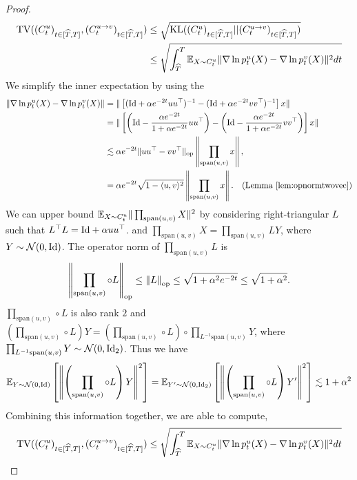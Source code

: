 \begin{proof}
\begin{align*}
\mathrm{TV}((C^u_t)_{t \in [\widehat{T},T]},(C^{u \to v}_t)_{t \in [\widehat{T},T]}) &\leq \sqrt{\mathrm{KL}((C^u_t)_{t \in [\widehat{T},T]}||(C^{u \to v}_t)_{t \in [\widehat{T},T]})}\\
&\leq \sqrt{\int_{\widehat{T}}^T \mathbb{E}_{X \sim C^u_t}\|\nabla \ln p^u_t(X) - \nabla \ln p^v_t(X)\|^2 dt}
\end{align*}
We simplify the inner expectation by using the 
\begin{align*}
\|\nabla \ln p^u_t(X)- \nabla \ln p^v_t(X)\| &= \|\left[(\mathrm{Id}+\alpha e^{-2t}uu^\top)^{-1}-(\mathrm{Id}+\alpha e^{-2t}vv^\top)^{-1}\right]x\|\\
 &= \|\left[\left(\mathrm{Id}-\frac{\alpha e^{-2t}}{1+\alpha e^{-2t}}uu^\top\right)-\left(\mathrm{Id}-\frac{\alpha e^{-2t}}{1+\alpha e^{-2t}}vv^\top\right)\right]x\|\\
&\lesssim \alpha e^{-2t} \|uu^\top - vv^\top\|_{\rm op}\left\|\prod_{\textrm{span}(u,v)}x\right\|,\\
&= \alpha e^{-2t}\sqrt{1-\langle u,v\rangle^2}\left\|\prod_{\textrm{span}(u,v)}x\right\|.\quad (\text{Lemma}~\ref{lem:opnormtwovec})
\end{align*}
We can upper bound $\mathbb{E}_{X \sim C^u_t}\|\prod_{\textrm{span}(u,v)}X\|^2$ by considering right-triangular $L$ such that $L^\top L  = \mathrm{Id}+\alpha uu^\top$. and $\prod_{\textrm{span}(u,v)} X = \prod_{\textrm{span}(u,v)}L Y$, where $Y \sim \mathcal{N}(0,\mathrm{Id})$. The operator norm of $\prod_{\textrm{span}(u,v)} L$ is 
\begin{align*}
\left\| \prod_{\textrm{span}(u,v)} \circ L \right\|_{\rm op}   \leq \left\| L \right\|_{\rm op}   \leq \sqrt{1+\alpha^2e^{-2t}} \leq \sqrt{1+\alpha^2}.
\end{align*}
$\prod_{\textrm{span}(u,v)} \circ L$ is also rank $2$ and $\left(\prod_{\textrm{span}(u,v)}\circ L\right)Y=\left(\prod_{\textrm{span}(u,v)}\circ L \right)\circ \prod_{L^{-1}\textrm{span}(u,v)}Y$, where $\prod_{L^{-1}\textrm{span}(u,v)}Y \sim \mathcal{N}(0,\mathrm{Id}_2)$. Thus we have
\begin{align*}
\mathbb{E}_{Y \sim \mathcal{N}(0,\mathrm{Id})}\left[\left\|\left(\prod_{\textrm{span}(u,v)}\circ L\right)Y\right\|^2\right] = \mathbb{E}_{Y' \sim \mathcal{N}(0,\mathrm{Id}_2)}\left[\left\|\left(\prod_{\textrm{span}(u,v)}\circ L \right)Y'\right\|^2\right] \lesssim 1+\alpha^2
\end{align*}
Combining this information together, we are able to compute,
\begin{align*}
\TV((C^u_t)_{t \in [\wh{T},T]},(C^{u \to v}_t)_{t \in [\wh{T},T]})  &\leq \sqrt{\int_{\wh{T}}^T \E_{X \sim C^u_t}\|\nabla \ln p^u_t(X) - \nabla \ln p^v_t(X)\|^2 dt}\\

\end{align*}
\end{proof}
